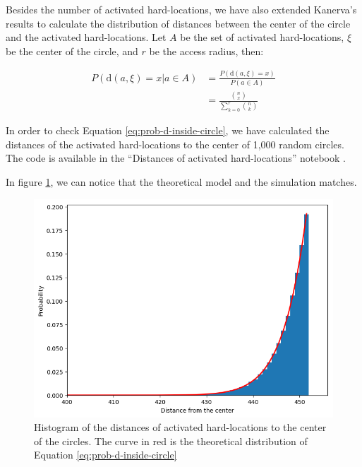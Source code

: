 Besides the number of activated hard-locations, we have also extended Kanerva's results to calculate the distribution of distances between the center of the circle and the activated hard-locations. Let $A$ be the set of activated hard-locations, $\xi$ be the center of the circle, and $r$ be the access radius, then:

\begin{align}
P(\text{d}(a, \xi)=x | a \in A) &= \frac{P(\text{d}(a, \xi)=x)}{P(a \in A)} \\
    &= \frac{\binom{n}{x}}{\sum_{k=0}^r \binom{n}{k}} \label{eq:prob-d-inside-circle}
\end{align}

In order to check Equation \ref{eq:prob-d-inside-circle}, we have calculated the distances of the activated hard-locations to the center of 1,000 random circles. The code is available in the ``Distances of activated hard-locations'' notebook \citep{sdmframework}.

In figure \ref{fig:validation-distance-activated-hls}, we can notice that the theoretical model and the simulation matches.

\begin{figure}[!htb]
\centering\includegraphics[width=\textwidth]{./images02/new-images/distance-activated-hls.png}

\caption{Histogram of the distances of activated hard-locations to the center of the circles. The curve in red is the theoretical distribution of Equation \ref{eq:prob-d-inside-circle}
\label{fig:validation-distance-activated-hls}}
\end{figure}

